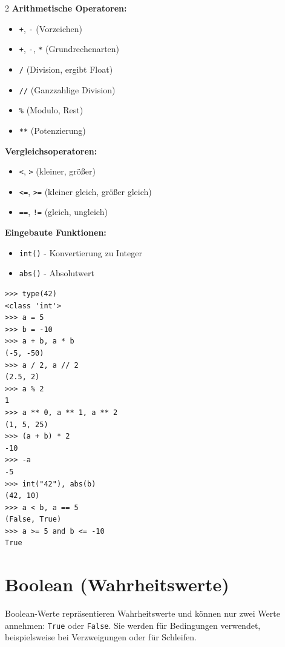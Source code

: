 \documentclass[ngerman,11pt]{article}
\begin{document}
\begin{multicols}{2}\raggedcolumns
\noindent\textbf{Arithmetische Operatoren:}
\begin{itemize}[leftmargin=*]
    \item \texttt{+}, \texttt{-} (Vorzeichen)
    \item \texttt{+}, \texttt{-}, \texttt{*} (Grundrechenarten)
    \item \texttt{/} (Division, ergibt Float)
    \item \texttt{//} (Ganzzahlige Division)
    \item \texttt{\%} (Modulo, Rest)
    \item \texttt{**} (Potenzierung)
\end{itemize}
\par\bigskip

\noindent\textbf{Vergleichsoperatoren:}
\begin{itemize}[leftmargin=*]
    \item \texttt{<}, \texttt{>} (kleiner, größer)
    \item \texttt{<=}, \texttt{>=} (kleiner gleich, größer gleich)
    \item \texttt{==}, \texttt{!=} (gleich, ungleich)
\end{itemize}
\par\bigskip

\noindent\textbf{Eingebaute Funktionen:}
\begin{itemize}[leftmargin=*]
    \item \texttt{int()} - Konvertierung zu Integer
    \item \texttt{abs()} - Absolutwert
\end{itemize}
\columnbreak
\begin{lstlisting}
>>> type(42)
<class 'int'>
>>> a = 5
>>> b = -10
>>> a + b, a * b
(-5, -50)
>>> a / 2, a // 2
(2.5, 2)
>>> a % 2
1
>>> a ** 0, a ** 1, a ** 2
(1, 5, 25)
>>> (a + b) * 2
-10
>>> -a
-5
>>> int("42"), abs(b)
(42, 10)
>>> a < b, a == 5
(False, True)
>>> a >= 5 and b <= -10
True
\end{lstlisting}
\end{multicols}

\section{Boolean (Wahrheitswerte)}

Boolean-Werte repräsentieren Wahrheitswerte und können nur zwei Werte annehmen: \texttt{True} oder \texttt{False}. Sie werden für Bedingungen verwendet, beispielsweise bei Verzweigungen oder für Schleifen.
\end{document}
